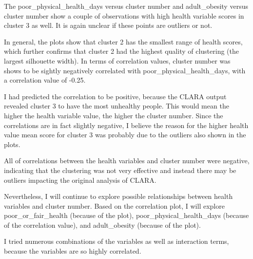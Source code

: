 \documentclass[12pt,twoside]{amherstthesis}
\begin{document}
  The poor\_physical\_health\_days versus cluster number and
  adult\_obesity versus cluster number show a couple of observations with
  high health variable scores in cluster 3 as well. It is again unclear if
  these points are outliers or not.
  
  In general, the plots show that cluster 2 has the smallest range of
  health scores, which further confirms that cluster 2 had the highest
  quality of clustering (the largest silhouette width). In terms of
  correlation values, cluster number was shows to be sightly negatively
  correlated with poor\_physical\_health\_days, with a correlation value
  of -0.25.
  
  I had predicted the correlation to be positive, because the CLARA output
  revealed cluster 3 to have the most unhealthy people. This would mean
  the higher the health variable value, the higher the cluster number.
  Since the correlations are in fact slightly negative, I believe the
  reason for the higher health value mean score for cluster 3 was probably
  due to the outliers also shown in the plots.
  
  All of correlations between the health variables and cluster number were
  negative, indicating that the clustering was not very effective and
  instead there may be outliers impacting the original analysis of CLARA.
  
  Nevertheless, I will continue to explore possible relationships between
  health variables and cluster number. Based on the correlation plot, I
  will explore poor\_or\_fair\_health (because of the plot),
  poor\_physical\_health\_days (because of the correlation value), and
  adult\_obesity (because of the plot).
  
  I tried numerous combinations of the variables as well as interaction
  terms, because the variables are so highly correlated.
  
\end{document}
